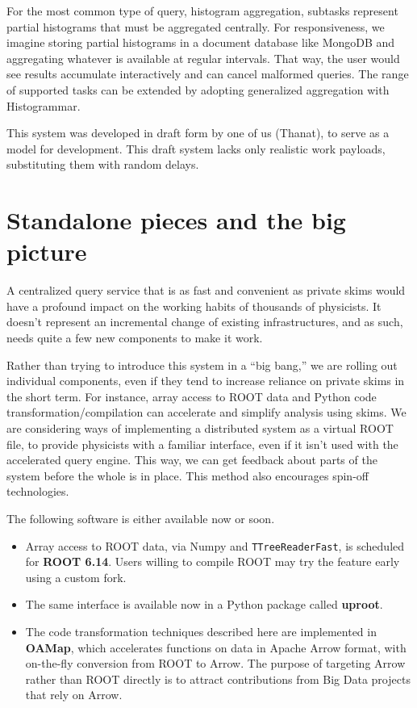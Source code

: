 \documentclass[a4paper]{jpconf}
\begin{document}
For the most common type of query, histogram aggregation, subtasks represent partial histograms that must be aggregated centrally. For responsiveness, we imagine storing partial histograms in a document database like MongoDB and aggregating whatever is available at regular intervals. That way, the user would see results accumulate interactively and can cancel malformed queries. The range of supported tasks can be extended by adopting generalized aggregation with Histogrammar\cite{histogrammar}.

This system was developed in draft form by one of us (Thanat)\cite{thanat}, to serve as a model for development. This draft system lacks only realistic work payloads, substituting them with random delays.

\section{Standalone pieces and the big picture}

A centralized query service that is as fast and convenient as private skims would have a profound impact on the working habits of thousands of physicists. It doesn't represent an incremental change of existing infrastructures, and as such, needs quite a few new components to make it work.

Rather than trying to introduce this system in a ``big bang,'' we are rolling out individual components, even if they tend to increase reliance on private skims in the short term. For instance, array access to ROOT data and Python code transformation/compilation can accelerate and simplify analysis using skims. We are considering ways of implementing a distributed system as a virtual ROOT file, to provide physicists with a familiar interface, even if it isn't used with the accelerated query engine. This way, we can get feedback about parts of the system before the whole is in place. This method also encourages spin-off technologies.

The following software is either available now or soon.
\begin{itemize}
\item Array access to ROOT data, via Numpy and {\tt TTreeReaderFast}, is scheduled for {\bf ROOT 6.14}\cite{root}. Users willing to compile ROOT may try the feature early using a custom fork\cite{root-brian}.
\item The same interface is available now in a Python package called {\bf uproot}\cite{uproot}.
\item The code transformation techniques described here are implemented in {\bf OAMap}\cite{oamap}, which accelerates functions on data in Apache Arrow\cite{arrow} format, with on-the-fly conversion from ROOT to Arrow. The purpose of targeting Arrow rather than ROOT directly is to attract contributions from Big Data projects that rely on Arrow.
\end{itemize}
\end{document}
